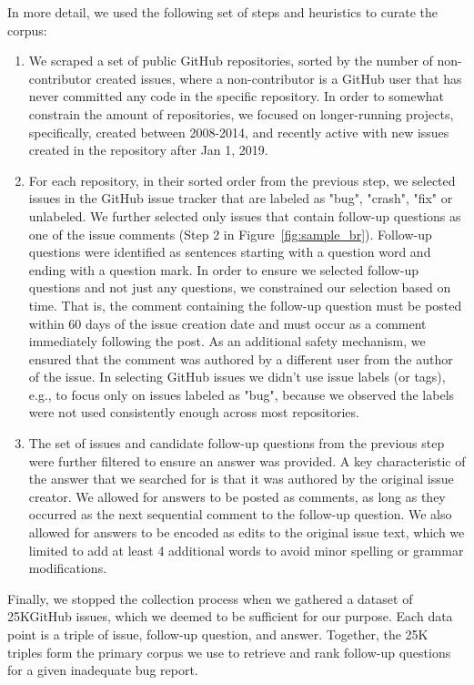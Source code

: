 In more detail, we used the following set of steps and heuristics to curate the corpus:
\begin{enumerate}
\item We scraped a set of public GitHub repositories, sorted by the number of
non-contributor created issues, where a non-contributor is a GitHub user that has never
committed any code in the specific repository. In order to somewhat constrain the amount of repositories,
we focused on longer-running projects, specifically, created between 2008-2014, and recently
active with new issues created in the repository after Jan 1, 2019.
\item For each repository, in their sorted order from the previous step, we selected issues in the GitHub issue tracker
that are labeled as "bug", "crash", "fix" or unlabeled. We further selected only issues that contain follow-up questions as one of the issue comments (Step 2 in Figure~\ref{fig:sample_br}).  Follow-up questions were identified as sentences starting with a question word and ending with a question mark. In order to ensure we selected follow-up questions and not just
any questions, we constrained our selection based on time. That is, the comment containing the follow-up question must be posted
within 60 days of the issue creation date and must occur as a comment immediately following the post. As an additional safety mechanism,
we ensured that the comment was authored by a different user from the author of the issue. In selecting GitHub issues
we didn't use issue labels (or tags), e.g., to focus only on issues labeled as "bug", because we observed the labels were not
used consistently enough across most repositories.
\item The set of issues and candidate follow-up questions from the previous step were further filtered to
ensure an answer was provided. A key characteristic of the answer that we searched for is that it was authored
by the original issue creator. We allowed for answers to be posted as comments, as long as they occurred as the next sequential comment
to the follow-up question. We also allowed for answers to be encoded as edits to the original issue text, which we limited to add at least 4 additional words to avoid minor spelling or grammar modifications.
\end{enumerate}

Finally, we stopped the collection process when we gathered a dataset of 25KGitHub issues, which we deemed to be
sufficient for our purpose. Each data point is a triple of
issue, follow-up question, and answer. Together, the 25K triples form the primary corpus we use to
retrieve and rank follow-up questions for a given inadequate bug report.

